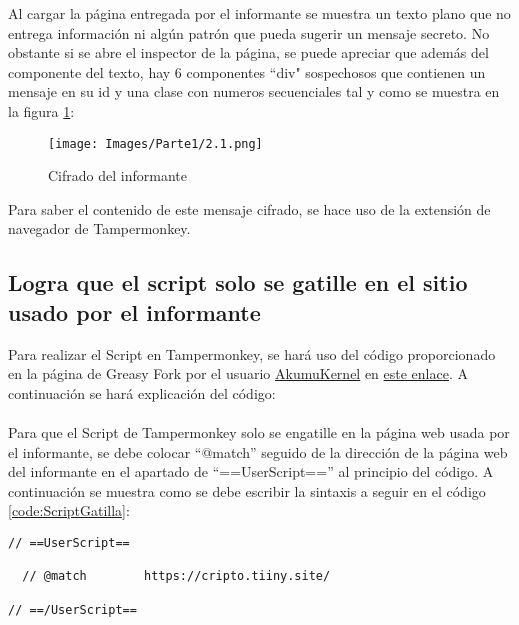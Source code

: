 \documentclass[letter,12pt]{article}
\newcounter{codecount}
\begin{document}
Al cargar la página entregada por el informante se muestra un texto plano que no entrega información ni algún patrón que pueda sugerir un mensaje secreto. No obstante si se abre el inspector de la página, se puede apreciar que además del componente del texto, hay 6 componentes ``div" sospechosos que contienen un mensaje en su id y una clase con numeros secuenciales tal y como se muestra en la figura \ref{fig:Cifradodelinformante}:

\begin{figure}[H]
    \centering
    \texttt{[image: Images/Parte1/2.1.png]}
    \caption{Cifrado del informante}
    \label{fig:Cifradodelinformante}
\end{figure}

Para saber el contenido de este mensaje cifrado, se hace uso de la extensión de navegador de Tampermonkey.

\clearpage

\subsection{Logra que el script solo se gatille en el sitio usado por el informante}

Para realizar el Script en Tampermonkey, se hará uso del código proporcionado en la página de Greasy Fork por el usuario \href{https://greasyfork.org/es/users/1214768-akumukernel}{AkumuKernel} en \href{https://greasyfork.org/es/scripts/479454-cryptojs/code}{este enlace}. A continuación se hará explicación del código:\\
\\
Para que el Script de Tampermonkey solo se engatille en la página web usada por el informante, se debe colocar ``@match'' seguido de la dirección de la página web del informante en el apartado de ``==UserScript=='' al principio del código. A continuación se muestra como se debe escribir la sintaxis a seguir en el código \ref{code:ScriptGatilla}:\\

\label{code:ScriptGatilla}
\begin{lstlisting}[caption=Apuntar a la página donde se debe ejecutar, label=lst:javascript_example]
// ==UserScript==

  // @match        https://cripto.tiiny.site/
  
// ==/UserScript==

\end{lstlisting}
\end{document}
